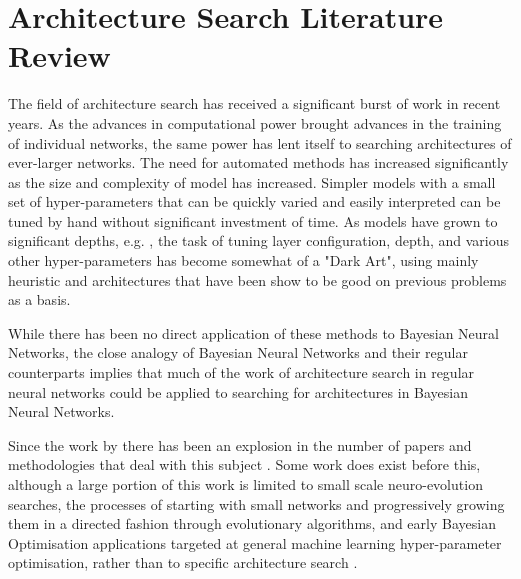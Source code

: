 
\chapter{Architecture Search Literature Review}

\ifpdf
    \graphicspath{{Chapter4/Figs/Raster/}{Chapter4/Figs/PDF/}{Chapter4/Figs/}}
\else
    \graphicspath{{Chapter4/Figs/Vector/}{Chapter4/Figs/}}
\fi

The field of architecture search has received a significant burst of work in recent years. As the advances in computational power brought advances in the training of individual networks, the same power has lent itself to searching architectures of ever-larger networks. The need for automated methods has increased significantly as the size and complexity of model has increased. Simpler models with a small set of hyper-parameters that can be quickly varied and easily interpreted can be tuned by hand without significant investment of time. As models have grown to significant depths, e.g. \citet{DBLP:journals/corr/SzegedyIV16}, the task of tuning layer configuration, depth, and various other hyper-parameters has become somewhat of a "Dark Art", using mainly heuristic and architectures that have been show to be good on previous problems as a basis.

While there has been no direct application of these methods to Bayesian Neural Networks, the close analogy of Bayesian Neural Networks and their regular counterparts implies that much of the work of architecture search in regular neural networks could be applied to searching for architectures in Bayesian Neural Networks.

Since the work by \citet{zoph2016neural} there has been an explosion in the number of papers and methodologies that deal with this subject \citep{mendoza2016towards,Baker2016,zoph2016neural,miikkulainen2019evolving,Cai2018,Adam2019,Sciuto,Wang,Li,Bender2018,liu2018progressive,fusi2018probabilistic,zoph2018learning,liu2018darts,Pham2018,kandasamy2018neural,zhong2017practical,negrinho2017deeparchitect,cortes2017adanet,Brock2017,real2017large,liu2017hierarchical,xie2017genetic,jenatton2017bayesian,Zela2018}. Some work does exist before this, although a large portion of this work is limited to small scale neuro-evolution searches, the processes of starting with small networks and progressively growing them in a directed fashion through evolutionary algorithms, and early Bayesian Optimisation applications targeted at general machine learning hyper-parameter optimisation, rather than to specific architecture search \citep{swersky2014raiders,bergstra2013making,snoek2012practical,stanley2002evolving,kitano1990designing,zhang2016flash}.

